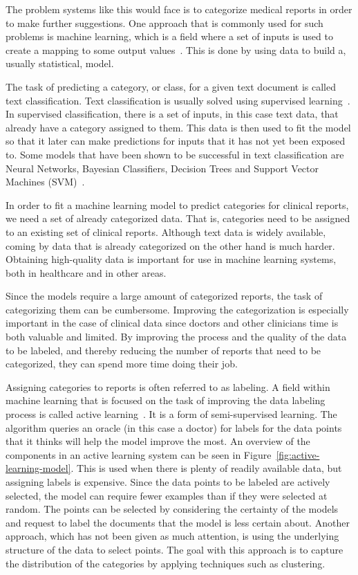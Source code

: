 The problem systems like this would face is to categorize medical reports in order to make further suggestions.
One approach that is commonly used for such problems is machine learning, which is a field where a set of inputs is used to create a mapping to some output values~\cite{bishop2006pattern}.
This is done by using data to build a, usually statistical, model.

The task of predicting a category, or class, for a given text document is called text classification.
Text classification is usually solved using supervised learning~\cite{aggarwal2012surveyclass}. 
In supervised classification, there is a set of inputs, in this case text data, that already have a category assigned to them.
This data is then used to fit the model so that it later can make predictions for inputs that it has not yet been exposed to.
Some models that have been shown to be successful in text classification are Neural Networks, Bayesian Classifiers, Decision Trees and Support Vector Machines (SVM)~\cite{aggarwal2012surveyclass,joachims1998text, tong2001support}.

In order to fit a machine learning model to predict categories for clinical reports, we need a set of already categorized data.
That is, categories need to be assigned to an existing set of clinical reports.
Although text data is widely available, coming by data that is already categorized on the other hand is much harder.
Obtaining high-quality data is important for use in machine learning systems, both in healthcare and in other areas.

Since the models require a large amount of categorized reports, the task of categorizing them can be cumbersome.
Improving the categorization is especially important in the case of clinical data since doctors and other clinicians time is both valuable and limited.
By improving the process and the quality of the data to be labeled, and thereby reducing the number of reports that need to be categorized, they can spend more time doing their job.

Assigning categories to reports is often referred to as labeling.
A field within machine learning that is focused on the task of improving the data labeling process is called active learning~\cite{settles2012active}.
It is a form of semi-supervised learning.
The algorithm queries an oracle (in this case a doctor) for labels for the data points that it thinks will help the model improve the most.
An overview of the components in an active learning system can be seen in Figure~\ref{fig:active-learning-model}.
This is used when there is plenty of readily available data, but assigning labels is expensive.
Since the data points to be labeled are actively selected, the model can require fewer examples than if they were selected at random.
The points can be selected by considering the certainty of the models and request to label the documents that the model is less certain about.
Another approach, which has not been given as much attention, is using the underlying structure of the data to select points.
The goal with this approach is to capture the distribution of the categories by applying techniques such as clustering.


